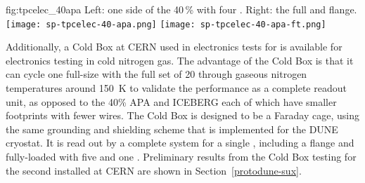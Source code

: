 \begin{dunefigure}
{fig:tpcelec_40apa}
{Left: one side of the \num{40}\,\%  with four .  Right: the full  \fdth and flange.}
\texttt{[image: sp-tpcelec-40-apa.png]}
\hspace{3mm}
\texttt{[image: sp-tpcelec-40-apa-ft.png]}
\end{dunefigure}



Additionally, a Cold Box at CERN used in electronics tests for  is available for electronics testing 
in cold nitrogen gas. The advantage of the Cold Box is that it can cycle one full-size  with the full 
set of \num{20}  through gaseous nitrogen temperatures around \SI{150}{K} to validate the  
performance as a complete  readout unit, as opposed to the 40\% APA and ICEBERG each of which have smaller
 footprints with fewer wires. The Cold Box is designed to be a Faraday cage, using the same grounding 
and shielding scheme that is implemented for the DUNE \single cryostat. It is read out by a complete  
system for a single , including a  flange and fully-loaded 
 with five  and one . Preliminary results from the  Cold Box testing 
for the second  installed at CERN are shown in Section~\ref{protodune-sux}.


